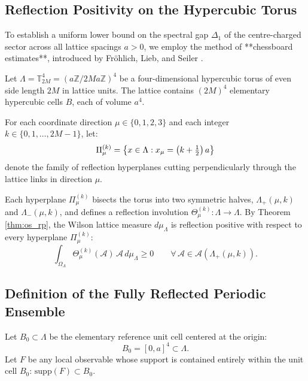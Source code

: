 \subsection{Reflection Positivity on the Hypercubic Torus}
\label{subsec:rp_hypercubic_torus}

To establish a uniform lower bound on the spectral gap $\Delta_1$ of the centre-charged sector across all lattice spacings $a > 0$, we employ the method of **chessboard estimates**, introduced by Fr{\"o}hlich, Lieb, and Seiler \cite{FrohlichLieb1978,FrohlichLiebSeiler1976}.

Let $\Lambda = \mathbb{T}_{2M}^4 = (a \mathbb{Z} / 2M a \mathbb{Z})^4$ be a four-dimensional hypercubic torus of even side length $2M$ in lattice units. The lattice contains $(2M)^4$ elementary hypercubic cells $B$, each of volume $a^4$.

For each coordinate direction $\mu \in \{0, 1, 2, 3\}$ and each integer $k \in \{0, 1, \dots, 2M-1\}$, let:
\begin{equation}
\Pi_\mu^{(k)} = \left\{ x \in \Lambda : x_\mu = \left( k + \tfrac{1}{2} \right) a \right\}
\end{equation}
denote the family of reflection hyperplanes cutting perpendicularly through the lattice links in direction $\mu$.

Each hyperplane $\Pi_\mu^{(k)}$ bisects the torus into two symmetric halves, $\Lambda_+(\mu, k)$ and $\Lambda_-(\mu, k)$, and defines a reflection involution $\Theta_\mu^{(k)} : \Lambda \to \Lambda$. By Theorem \ref{thm:os_rp}, the Wilson lattice measure $d\mu_\Lambda$ is reflection positive with respect to every hyperplane $\Pi_\mu^{(k)}$:
\begin{equation}
\label{eq:ch11_hyperplane_rp}
\int_{\Omega_\Lambda} \Theta_\mu^{(k)}(\mathcal{A}) \, \mathcal{A} \, d\mu_\Lambda \ge 0 \qquad \forall \, \mathcal{A} \in \mathcal{A}(\Lambda_+(\mu, k)).
\end{equation}

\subsection{Definition of the Fully Reflected Periodic Ensemble}
\label{subsec:fully_reflected_ensemble}

Let $B_0 \subset \Lambda$ be the elementary reference unit cell centered at the origin:
\begin{equation}
B_0 = [0, a]^4 \subset \Lambda.
\end{equation}
Let $F$ be any local observable whose support is contained entirely within the unit cell $B_0$: $\mathrm{supp}(F) \subset B_0$.


